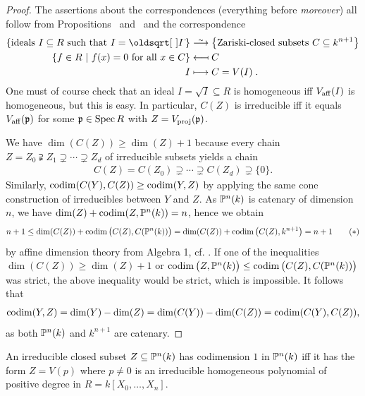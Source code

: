 \documentclass[a4paper,parskip=half,numbers=enddot, DIV=12]{scrreprt}
\begin{document}
\begin{proof}
The assertions about the correspondences (everything before \emph{moreover}) all follow from Propositions~
and~ and the correspondence
\begin{align*}
\left\{\text{ideals }I\subseteq R\text{ such that }I=\sqrt I\right\}&\isomorphism\left\{\text{Zariski-closed subsets }C\subseteq k^{n+1}\right\}\\
\left\{f\in R\st f(x)=0\text{ for all }x\in C\right\} &\longmapsfrom C\\
I&\longmapsto C=V(I)\;.
\end{align*}
One must of course check that an ideal $I=\sqrt I\subseteq R$ is homogeneous iff $V_{\mathrm{aff}}(I)$ is homogeneous, but this is easy. In particular, $C(Z)$ is irreducible iff it equals $V_{\mathrm{aff}}(\mathfrak{p})$ for some $\mathfrak{p} \in \operatorname{Spec} R$ with $Z=V_{\mathrm{proj}}(\mathfrak{p})$.

We have $\dim(C(Z))\geq \dim(Z)+1$ because every chain $Z = Z_0 \supsetneqq Z_1\supsetneq \cdots\supsetneq Z_d$
of irreducible subsets yields a chain
\begin{align*}
C(Z) = C(Z_0) \supsetneq \cdots\supsetneq C(Z_d)\supsetneq \{0\}.
\end{align*}
Similarly, $\operatorname{codim}(C(Y),C(Z)) \geq \operatorname{codim}(Y,Z)$ by applying the same cone construction of irreducibles between $Y$ and $Z$.
As $\mathbb{P}^n(k)$ is catenary of dimension $n$, we have $\dim(Z) + \operatorname{codim}(Z,\mathbb{P}^n(k)) = n$, hence we obtain
\begin{align}\lbl{eq:proofAffineConeCorrespondenceAst}
n+1\leq \dim(C(Z)) + \codim\big(C(Z),C(\IP^n(k))\big) = \dim(C(Z)) + \codim\big(C(Z),k^{n+1}\big)
= n+1\tag{$\ast$}
\end{align}
by affine dimension theory from Algebra 1, cf. \cite[Theorem~5]{alg1}.
If one of the inequalities $\dim(C(Z))\geq \dim(Z)+1$ or $\operatorname{codim}\big(Z,\mathbb{P}^n(k)\big) \leq \operatorname{codim}\big(C(Z), C(\mathbb{P}^n(k))\big)$ was strict,
the above inequality  would be strict, which is impossible. It follows that
\begin{align*}
\operatorname{codim}(Y,Z) = \dim(Y)-\dim(Z) = \dim(C(Y)) - \dim(C(Z)) = \operatorname{codim}(C(Y),C(Z)),
\end{align*}
as both $\mathbb{P}^n(k)$ and $k^{n+1}$ are catenary.
\end{proof}
\begin{cor}
An irreducible closed
subset $Z\subseteq\mathbb{P}^n(k)$ has codimension $1$ in $\mathbb{P}^n(k)$ iff it has the form $Z = V(p)$ where $p\neq 0$ is an irreducible homogeneous polynomial of positive degree in $R=k[X_0,\ldots,X_n]$.
\end{cor}
\end{document}
